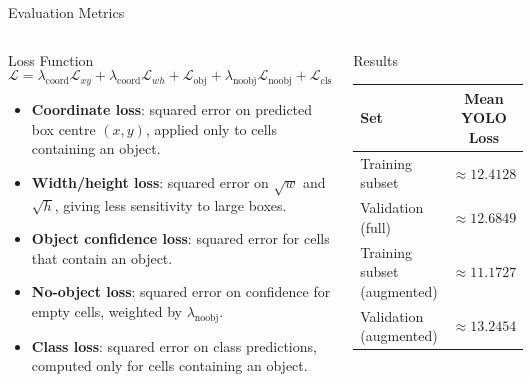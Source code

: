 \documentclass[aspectratio=169,10pt]{beamer}
\begin{document}
\begin{frame}{Evaluation Metrics}
  \begin{columns}[T]
       \begin{block}{Loss Function}
\footnotesize
\[
\mathcal{L}
=
\lambda_{\text{coord}} \mathcal{L}_{xy}
+
\lambda_{\text{coord}} \mathcal{L}_{wh}
+
\mathcal{L}_{\text{obj}}
+
\lambda_{\text{noobj}} \mathcal{L}_{\text{noobj}}
+
\mathcal{L}_{\text{cls}}
\]

\begin{itemize}\setlength\itemsep{2pt}
    \item \textbf{Coordinate loss}:
    squared error on predicted box centre $(x,y)$, applied only to cells containing an object.
    
    \item \textbf{Width/height loss}:
    squared error on $\sqrt{w}$ and $\sqrt{h}$, giving less sensitivity to large boxes.
    
    \item \textbf{Object confidence loss}:
    squared error for cells that contain an object.
    
    \item \textbf{No-object loss}:
    squared error on confidence for empty cells, weighted by $\lambda_{\text{noobj}}$.
    
    \item \textbf{Class loss}:
    squared error on class predictions, computed only for cells containing an object.
\end{itemize}
\end{block}

      \begin{block}{Results }
        \footnotesize
        \begin{tabular}{lc}
          \toprule
          \textbf{Set}       & \textbf{Mean YOLO Loss}\\
          \midrule
          Training subset              & $\approx 12.4128$\\
          Validation (full)             & $\approx 12.6849$\\
          \midrule
          Training subset (augmented)   & $\approx 11.1727$\\
          Validation (augmented)        & $\approx 13.2454$\\
          \bottomrule
        \end{tabular}
      \end{block}
      \vspace{4pt}
      \end{columns}
\end{frame}
\end{document}
